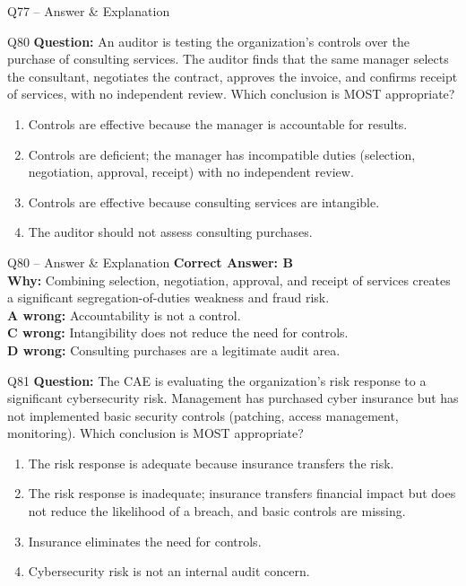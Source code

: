\documentclass[aspectratio=169,10pt]{beamer}
\begin{document}
\begin{frame}[t]{Q77 -- Answer \& Explanation}
	\begin{frame}[t]{Q80}
		\small
		\textbf{Question:} An auditor is testing the organization's controls over the purchase of consulting services. The auditor finds that the same manager selects the consultant, negotiates the contract, approves the invoice, and confirms receipt of services, with no independent review. Which conclusion is MOST appropriate?
		\begin{enumerate}[label=\Alph*.,itemsep=1pt,topsep=2pt]
			\item Controls are effective because the manager is accountable for results.
			\item Controls are deficient; the manager has incompatible duties (selection, negotiation, approval, receipt) with no independent review.
			\item Controls are effective because consulting services are intangible.
			\item The auditor should not assess consulting purchases.
		\end{enumerate}
	\end{frame}
	
	\begin{frame}[t]{Q80 -- Answer \& Explanation}
		\small
		\textbf{Correct Answer: B} \\[4pt]
		\textbf{Why:} Combining selection, negotiation, approval, and receipt of services creates a significant segregation-of-duties weakness and fraud risk. \\[4pt]
		\textbf{A wrong:} Accountability is not a control. \\[2pt]
		\textbf{C wrong:} Intangibility does not reduce the need for controls. \\[2pt]
		\textbf{D wrong:} Consulting purchases are a legitimate audit area.
	\end{frame}
	
	\begin{frame}[t]{Q81}
		\small
		\textbf{Question:} The CAE is evaluating the organization's risk response to a significant cybersecurity risk. Management has purchased cyber insurance but has not implemented basic security controls (patching, access management, monitoring). Which conclusion is MOST appropriate?
		\begin{enumerate}[label=\Alph*.,itemsep=1pt,topsep=2pt]
			\item The risk response is adequate because insurance transfers the risk.
			\item The risk response is inadequate; insurance transfers financial impact but does not reduce the likelihood of a breach, and basic controls are missing.
			\item Insurance eliminates the need for controls.
			\item Cybersecurity risk is not an internal audit concern.
		\end{enumerate}
	\end{frame}
	

\end{frame}
\end{document}
